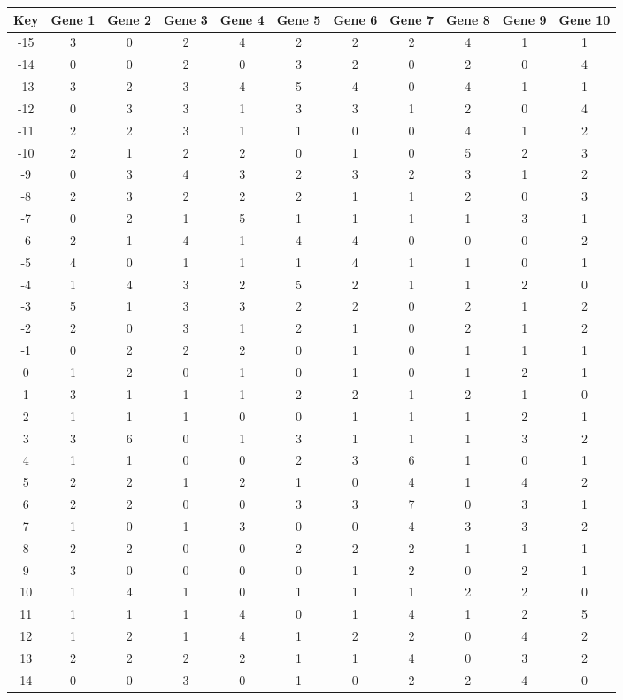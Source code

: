 \begin{tabular}{|c|c|c|c|c|c|c|c|c|c|c|}
\hline
Key & Gene 1 & Gene 2 & Gene 3 & Gene 4 & Gene 5 & Gene 6 & Gene 7 & Gene 8 & Gene 9 & Gene 10 \\
\hline
-15 & 3 & 0 & 2 & 4 & 2 & 2 & 2 & 4 & 1 & 1 \\
-14 & 0 & 0 & 2 & 0 & 3 & 2 & 0 & 2 & 0 & 4 \\
-13 & 3 & 2 & 3 & 4 & 5 & 4 & 0 & 4 & 1 & 1 \\
-12 & 0 & 3 & 3 & 1 & 3 & 3 & 1 & 2 & 0 & 4 \\
-11 & 2 & 2 & 3 & 1 & 1 & 0 & 0 & 4 & 1 & 2 \\
-10 & 2 & 1 & 2 & 2 & 0 & 1 & 0 & 5 & 2 & 3 \\
-9 & 0 & 3 & 4 & 3 & 2 & 3 & 2 & 3 & 1 & 2 \\
-8 & 2 & 3 & 2 & 2 & 2 & 1 & 1 & 2 & 0 & 3 \\
-7 & 0 & 2 & 1 & 5 & 1 & 1 & 1 & 1 & 3 & 1 \\
-6 & 2 & 1 & 4 & 1 & 4 & 4 & 0 & 0 & 0 & 2 \\
-5 & 4 & 0 & 1 & 1 & 1 & 4 & 1 & 1 & 0 & 1 \\
-4 & 1 & 4 & 3 & 2 & 5 & 2 & 1 & 1 & 2 & 0 \\
-3 & 5 & 1 & 3 & 3 & 2 & 2 & 0 & 2 & 1 & 2 \\
-2 & 2 & 0 & 3 & 1 & 2 & 1 & 0 & 2 & 1 & 2 \\
-1 & 0 & 2 & 2 & 2 & 0 & 1 & 0 & 1 & 1 & 1 \\
0 & 1 & 2 & 0 & 1 & 0 & 1 & 0 & 1 & 2 & 1 \\
1 & 3 & 1 & 1 & 1 & 2 & 2 & 1 & 2 & 1 & 0 \\
2 & 1 & 1 & 1 & 0 & 0 & 1 & 1 & 1 & 2 & 1 \\
3 & 3 & 6 & 0 & 1 & 3 & 1 & 1 & 1 & 3 & 2 \\
4 & 1 & 1 & 0 & 0 & 2 & 3 & 6 & 1 & 0 & 1 \\
5 & 2 & 2 & 1 & 2 & 1 & 0 & 4 & 1 & 4 & 2 \\
6 & 2 & 2 & 0 & 0 & 3 & 3 & 7 & 0 & 3 & 1 \\
7 & 1 & 0 & 1 & 3 & 0 & 0 & 4 & 3 & 3 & 2 \\
8 & 2 & 2 & 0 & 0 & 2 & 2 & 2 & 1 & 1 & 1 \\
9 & 3 & 0 & 0 & 0 & 0 & 1 & 2 & 0 & 2 & 1 \\
10 & 1 & 4 & 1 & 0 & 1 & 1 & 1 & 2 & 2 & 0 \\
11 & 1 & 1 & 1 & 4 & 0 & 1 & 4 & 1 & 2 & 5 \\
12 & 1 & 2 & 1 & 4 & 1 & 2 & 2 & 0 & 4 & 2 \\
13 & 2 & 2 & 2 & 2 & 1 & 1 & 4 & 0 & 3 & 2 \\
14 & 0 & 0 & 3 & 0 & 1 & 0 & 2 & 2 & 4 & 0 \\
\hline
\end{tabular}